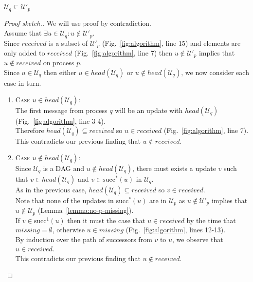 \documentclass[manuscript,anonymous]{acmart}
\begin{document}
\begin{lemma}\label{lemma:no-q-missing}
$\mathcal{U}_q \subseteq \mathcal{U}'_p$
\end{lemma}
\begin{proof}[Proof sketch.]
We will use proof by contradiction.\\
Assume that $\exists u \in \mathcal{U}_q: u \notin  \mathcal{U}'_p$.\\
Since $\mathit{received}$ is a subset of $\mathcal{U}'_p$ (Fig.~\ref{fig:algorithm}, line 15) and elements are only added to $\mathit{received}$ (Fig.~\ref{fig:algorithm}, line 7) then $u \notin  \mathcal{U}'_p$ implies that $u \notin \mathit{received}$ on process $p$.\\
Since $u \in \mathcal{U}_q$ then either $u \in \mathit{head}(\mathcal{U}_q)$ or $u \notin \mathit{head}(\mathcal{U}_q)$, we now consider each case in turn.
\begin{enumerate}
    \item\textsc{Case} $u \in head(\mathcal{U}_q)$:\\
    The first message from process $q$ will be an update with $\mathit{head}(\mathcal{U}_q)$ (Fig.~\ref{fig:algorithm}, line 3-4).\\
    Therefore $\mathit{head}(\mathcal{U}_q) \subseteq \mathit{received}$ so $u \in \mathit{received}$ (Fig.~\ref{fig:algorithm}, line 7).\\
    This contradicts our previous finding that $u \notin \mathit{received}$.
    
    \item\textsc{Case} $u \notin \mathit{head}(\mathcal{U}_q)$:\\
    Since $\mathcal{U}_q$ is a DAG and $u \notin \mathit{head}(\mathcal{U}_q)$, there must exists a update $v$ such that $v \in \mathit{head}(\mathcal{U}_q)$ and $v \in \mathrm{succ}^*(u)$ in $\mathcal{U}_q$.\\
    As in the previous case, $\mathit{head}(\mathcal{U}_q) \subseteq \mathit{received}$ so $v \in \mathit{received}$.\\
    Note that none of the updates in $\mathrm{succ}^*(u)$ are in $\mathcal{U}_p$ as $u \notin \mathcal{U}'_p$ implies that  $u \notin \mathcal{U}_p$ (Lemma~\ref{lemma:no-p-missing}).\\
    If $v \in \mathrm{succ}^1(u)$ then it must the case that $u \in \mathit{received}$ by the time that $\mathit{missing} = \emptyset$, otherwise $u \in \mathit{missing}$ (Fig.~\ref{fig:algorithm}, lines 12-13).\\
    By induction over the path of successors from $v$ to $u$, we observe that $u \in \mathit{received}$.\\
    This contradicts our previous finding that $u \notin \mathit{received}$.
\end{enumerate}
\end{proof}
\end{document}

